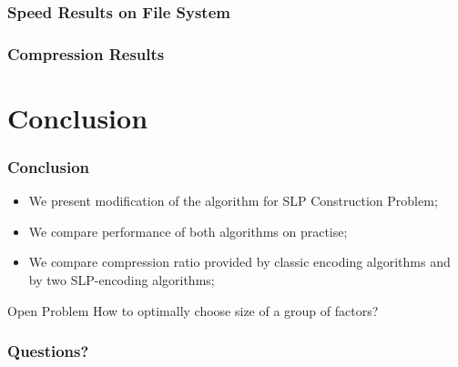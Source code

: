\documentclass{beamer}
\begin{document}
\begin{frame}
\frametitle{Speed Results on File System}

\begin{center}
	\DNASpeedTestInFile
\end{center}
\end{frame}

\begin{frame}
\frametitle{Compression Results}

\begin{center}
	\DNACompression
\end{center}
\end{frame}

\section*{Conclusion}

\begin{frame}
\frametitle{Conclusion}

\begin{itemize}
  \item We present modification of the algorithm for SLP Construction Problem;
  \item We compare performance of both algorithms on practise;
  \item We compare compression ratio provided by classic encoding algorithms and
  by two SLP-encoding algorithms;
\end{itemize}

\pause

\begin{alertblock}{Open Problem}
How to optimally choose size of a group of factors?
\end{alertblock}
\end{frame}

\begin{frame}
\frametitle{Questions?}

\begin{center}
\end{center}
\end{frame}
\end{document}
